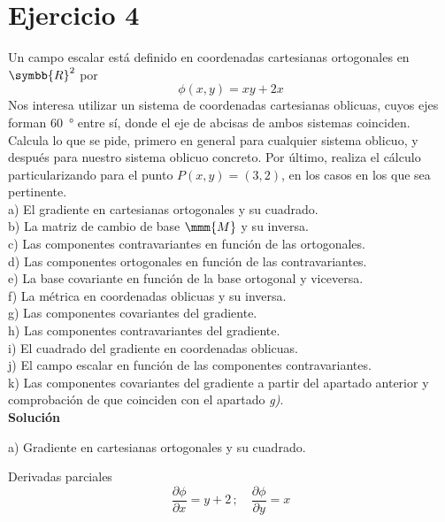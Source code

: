%

\section{Ejercicio 4}
Un campo escalar está definido en coordenadas cartesianas ortogonales en $\symbb{R}^2$
por
\[
  \phi(x,y) = xy + 2x
\]
Nos interesa utilizar un sistema de coordenadas cartesianas oblicuas, cuyos ejes forman
\qty{60}{\degree} entre sí, donde el eje de abcisas de ambos sistemas coinciden.\\
Calcula lo que se pide, primero en general para cualquier sistema oblicuo, y después
para nuestro sistema oblicuo concreto. Por último, realiza el cálculo particularizando para el punto $P(x,y) = (3,2)$, en los casos en los que sea pertinente.\\
a) El gradiente en cartesianas ortogonales y su cuadrado.\\
b) La matriz de cambio de base $\mmm{M}$ y su inversa.\\
c) Las componentes contravariantes en función de las ortogonales.\\
d) Las componentes ortogonales en función de las contravariantes.\\
e) La base covariante en función de la base ortogonal y viceversa.\\
f) La métrica en coordenadas oblicuas y su inversa.\\
g) Las componentes covariantes del gradiente.\\
h) Las componentes contravariantes del gradiente.\\
i) El cuadrado del gradiente en coordenadas oblicuas.\\
j) El campo escalar en función de las componentes contravariantes.\\
k) Las componentes covariantes del gradiente a partir del apartado anterior y comprobación de que coinciden con el apartado \emph{g)}.\\

\noindent
\textbf{Solución}

\noindent
a) Gradiente en cartesianas ortogonales y su cuadrado.

Derivadas parciales
\[
  \dfrac{\partial\phi}{\partial x} = y + 2
  \,;\hspace{1em}
  \dfrac{\partial\phi}{\partial y} = x
\]

